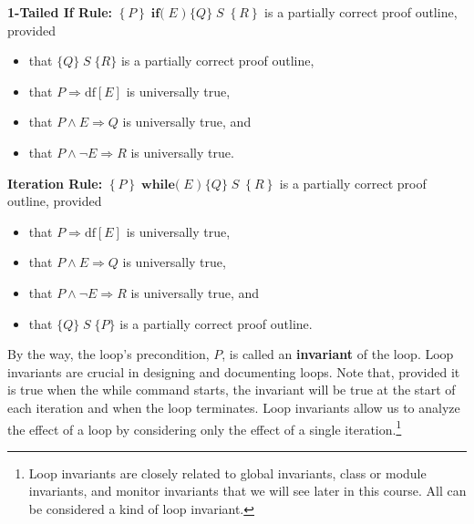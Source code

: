 \documentclass[muchmore,11pt]{article}%
\begin{document}
\textbf{1-Tailed If Rule:} $\left\{  P\right\}  \;\mathbf{if(}%
\;E\;)\;\{Q\}\;S\;\left\{  R\right\}  $ is a partially correct proof outline, provided

\begin{itemize}
\item that $\{Q\}\;S\;\{R\}$ is a partially correct proof outline,

\item that $P\Rightarrow\mathrm{df}[E]$ is universally true,

\item that $P\wedge E\Rightarrow Q$ is universally true, and

\item that $P\wedge\lnot E\Rightarrow R$ is universally true.
\end{itemize}

\textbf{Iteration Rule:} $\left\{  P\right\}  \;\mathbf{while(}%
\;E\;)\;\{Q\}\;S\;\left\{  R\right\}  $ is a partially correct proof outline, provided

\begin{itemize}
\item that $P\Rightarrow\mathrm{df}[E]$ is universally true,

\item that $P\wedge E\Rightarrow Q$ is universally true,

\item that $P\wedge\lnot E\Rightarrow R$ is universally true, and

\item that $\{Q\}\;S\;\{P\}$ is a partially correct proof outline.
\end{itemize}

By the way, the loop's precondition, $P$, is called an \textbf{invariant} of
the loop. Loop invariants are crucial in designing and documenting loops. Note
that, provided it is true when the while command starts, the invariant will be
true at the start of each iteration and when the loop terminates. Loop
invariants allow us to analyze the effect of a loop by considering only the
effect of a single iteration.\footnote{Loop invariants are closely related to
global invariants, class or module invariants, and monitor invariants that we
will see later in this course. All can be considered a kind of loop
invariant.}
\end{document}

